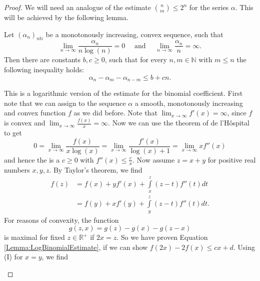\documentclass[
11pt,                          %
english                        %
]{article}
\begin{document}
\begin{proof}
	We will need an analogue of the estimate $\binom{n}{m} \leq 2^n$ for the series 
	$\alpha$. This will be achieved by the following lemma.
	\begin{lemma}
		Let $(\alpha_n)_{n \mathbb{N}}$ be a monotonously increasing, convex 
		sequence, such that
		\begin{equation*}
			\lim_{n \rightarrow \infty}
			\frac{\alpha_n}{n \log(n)}
			=
			0
			\quad \text{ and } \quad
			\lim_{n \rightarrow \infty}
			\frac{\alpha_n}{n}
			=
			\infty.
		\end{equation*}
		Then there are constants $b, c \geq 0$, such that for every $n,m \in 
		\mathbb{N}$ with $m \leq n$ the following inequality holds:
		\begin{equation}
		\label{Lemma:LogBinomialEstimate}
			\alpha_n - \alpha_m - \alpha_{n-m}
			\leq
			b + c n.
		\end{equation}
	\end{lemma}
	\begin{subproof}
		This is a logarithmic version of the estimate for the binomial coefficient.
		First note that we can assign to the sequence $\alpha$ a smooth, 
		monotonously increasing and convex function $f$ as we did before.
		Note that $\lim_{x \rightarrow \infty} f'(x) = \infty$, since $f$ is convex 
		and $\lim_{x \rightarrow \infty} \frac{f(x)}{x} = \infty$. Now we can use
		the theorem of de l'H\^{o}spital to get
		\begin{equation*}
			0 
			=
			\lim_{x \rightarrow \infty}
			\frac{f(x)}{x \log(x)}
			=
			\lim_{x \rightarrow \infty}
			\frac{f'(x)}{\log(x) + 1}
			=
			\lim_{x \rightarrow \infty}
			x f''(x)
		\end{equation*}
		and hence the is a $c \geq 0$ with $f''(x) \leq \frac{c}{x}$. 
		Now assume $z = x + y$ for positive real numbers $x,y,z$. By Taylor's 
		theorem, we find
		\begin{align*}
			\tag{I}
			f(z)
			&=
			f(x) + y f'(x)
			+ \int\limits_{x}^{z} (z - t) f''(t) dt
			\\
			\tag{II}
			&=
			f(y) + x f'(y)
			+ \int\limits_{y}^{z} (z - t) f''(t) dt.
		\end{align*}
		For reasons of convexity, the function
		\begin{equation*}
			g(z,x)
			=
			g(z) - g(x) - g(z-x)
		\end{equation*}
		is maximal for fixed $z \in \mathbb{R}^+$ if $2x = z$. So we have proven
		Equation \eqref{Lemma:LogBinomialEstimate}, if we can show 
		$f(2x) - 2f(x) \leq cx + d$. Using (I) for $x = y$, we find

\end{subproof}
\end{proof}
\end{document}
